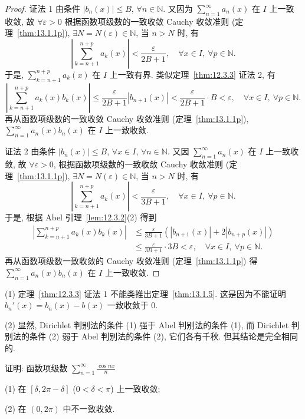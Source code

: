 \begin{proof}
证法 1 由条件 $|b_{n}(x)|\leqslant B$, $\forall n\in\mathbb{N}$. 又因为 $\sum_{n=1}^{\infty}a_{n}(x)$ 在 $I$ 上一致收敛, 故 $\forall\varepsilon>0$ 根据函数项级数的一致收敛 Cauchy 收敛准则 (定理~\ref{thm:13.1.1p}), $\exists N=N(\varepsilon)\in\mathbb{N}$, 当 $n>N$ 时, 有
\[
  \left|\sum_{k=n+1}^{n+p}a_{k}(x)\right|<\frac{\varepsilon}{2B+1},\quad\forall x\in I,\ \forall p\in\mathbb{N}.
\]
于是, $\sum_{k=n+1}^{n+p}a_{k}(x)$ 在 $I$ 上一致有界. 类似定理~\ref{thm:12.3.3} 证法 2, 有
\[
  \left|\sum_{k=n+1}^{n+p}a_{k}(x)b_{k}(x)\right|\leqslant\frac{\varepsilon}{2B+1}|b_{n+1}(x)|<\frac{\varepsilon}{2B+1}\cdot B<\varepsilon,\quad\forall x\in I,\ \forall p\in\mathbb{N}.
\]
再从函数项级数的一致收敛 Cauchy 收敛准则 (定理~\ref{thm:13.1.1p}), $\sum_{n=1}^{\infty}a_{n}(x)b_{n}(x)$ 在 $I$ 上一致收敛.

证法 2 由条件 $|b_{n}(x)|\leqslant B$, $\forall x\in I$, $\forall n\in\mathbb{N}$. 又因 $\sum_{n=1}^{\infty}a_{n}(x)$ 在 $I$ 上一致收敛, 故 $\forall\varepsilon>0$, 根据函数项级数的一致收敛 Cauchy 收敛准则 (定理~\ref{thm:13.1.1p}), $\exists N=N(\varepsilon)\in\mathbb{N}$, 当 $n>N$ 时, 有
\[
  \left|\sum_{k=n+1}^{n+p}a_{k}(x)\right|<\frac{\varepsilon}{3B+1},\quad\forall x\in I,\ \forall p\in\mathbb{N}.
\]
于是, 根据 Abel 引理~\ref{lem:12.3.2}(2) 得到
\[
  \begin{aligned}
    \left|\sum_{k=n+1}^{n+p}a_{k}(x)b_{k}(x)\right|&\leqslant\frac{\varepsilon}{3B+1}(|b_{n+1}(x)|+2|b_{n+p}(x)|)\\
    &\leqslant\frac{\varepsilon}{3B+1}\cdot3B<\varepsilon,\quad\forall x\in I,\ \forall p\in\mathbb{N}.
  \end{aligned}
\]
再从函数项级数一致收敛的 Cauchy 收敛准则 (定理~\ref{thm:13.1.1p}) 得 $\sum_{n=1}^{\infty}a_{n}(x)b_{n}(x)$ 在 $I$ 上一致收敛.
\end{proof}

\begin{remark}\label{rem:13.1.2}
(1) 定理~\ref{thm:12.3.3} 证法 1 不能类推出定理~\ref{thm:13.1.5}. 这是因为不能证明 $b_{n}'(x)=b_{n}(x)-b(x)$ 一致收敛于 $0$.

(2) 显然, Dirichlet 判别法的条件 (1) 强于 Abel 判别法的条件 (1), 而 Dirichlet 判别法的条件 (2) 弱于 Abel 判别法的条件 (2), 它们各有千秋. 但其结论是完全相同的.
\end{remark}

\begin{example}\label{ex:13.1.16}
证明: 函数项级数 $\sum_{n=1}^{\infty}\frac{\cos nx}{n}$

(1) 在 $[\delta,2\pi-\delta]$ ($0<\delta<\pi$) 上一致收敛;

(2) 在 $(0,2\pi)$ 中不一致收敛.
\end{example}


